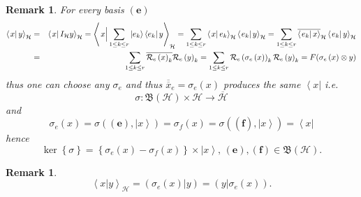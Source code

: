 \documentclass[aps,preprint]{revtex4}
\newtheorem{remark}[theorem]{Remark}
\begin{document}
\begin{remark}
For \emph{every basis} $\left( \boldsymbol{e}\right) $%
\begin{eqnarray}
\left\langle \left. x\right\vert y\right\rangle _{\mathcal{H}}
&=&\left\langle \left. x\right\vert I_{\mathcal{H}}y\right\rangle _{\mathcal{%
H}}=\left\langle \left. \overset{\overset{}{}}{x}\right\vert \sum_{1\leq
k\leq r}\left\vert e_{k}\right\rangle \left\langle e_{k}\right\vert
y\right\rangle _{\mathcal{H}}=\sum_{1\leq k\leq r}\left\langle \left.
x\right\vert e_{k}\right\rangle _{\mathcal{H}}\left\langle \left.
e_{k}\right\vert y\right\rangle _{\mathcal{H}}=\sum_{1\leq k\leq r}\overline{%
\left\langle \left. e_{k}\right\vert x\right\rangle }_{\mathcal{H}%
}\left\langle \left. e_{k}\right\vert y\right\rangle _{\mathcal{H}} \\
&=&\sum_{1\leq k\leq r}\overline{\mathcal{R}_{e}\left( x\right) _{k}}%
\mathcal{R}_{e}\left( y\right) _{k}=\sum_{1\leq k\leq r}\mathcal{R}%
_{e}\left( \sigma _{e}\left( x\right) \right) _{k}\mathcal{R}_{e}\left(
y\right) _{k}=F(\sigma _{e}\left( x\right) \otimes y)
\end{eqnarray}%
thus one can choose any $\sigma _{e}$ and thus $\overline{\overline{x}}%
_{e}=\sigma _{e}\left( x\right) $ produces the same $\left\langle
x\right\vert $ i.e. 
\begin{equation}
\sigma :\mathfrak{B}\left( \mathcal{H}\right) \times \mathcal{H}\rightarrow 
\overline{\mathcal{H}}
\end{equation}%
and%
\begin{equation}
\sigma _{e}\left( x\right) =\sigma \left( \left( \overset{}{\boldsymbol{e}}%
\right) ,\left\vert \overset{}{x}\right\rangle \right) =\sigma _{f}\left(
x\right) =\sigma \left( \left( \overset{}{\boldsymbol{f}}\right) ,\left\vert 
\overset{}{x}\right\rangle \right) =\left\langle x\right\vert
\end{equation}%
hence%
\begin{equation}
\ker \left\{ \sigma \right\} =\left\{ \sigma _{e}\left( x\right) -\sigma
_{f}\left( x\right) \right\} \times \left\vert x\right\rangle ,\,\left( 
\boldsymbol{e}\right) ,\left( \boldsymbol{f}\right) \in \mathfrak{B}\left( 
\mathcal{H}\right) .
\end{equation}
\end{remark}

\begin{remark}
\begin{equation}
\left\langle \left. x\right\vert y\right\rangle _{\mathcal{H}}=\left( \left.
\sigma _{e}\left( x\right) \right\vert y\right) =\left( \left. y\right\vert
\sigma _{e}\left( x\right) \right) .
\end{equation}
\end{remark}
\end{document}
